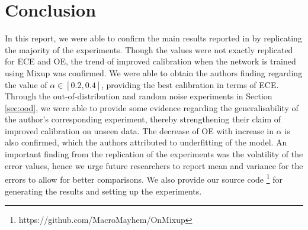 \documentclass{article}
\begin{document}
\section{Conclusion}
\label{sec:conclusion}
In this report, we were able to confirm the main
results reported in \cite{onmixup} by replicating the majority of the experiments. Though the values were not exactly replicated for ECE and OE, the trend of improved calibration when the network is trained using Mixup was confirmed. We were able to obtain the authors finding regarding the value of $\alpha \in [0.2, 0.4]$, providing the best calibration in terms of ECE. Through the out-of-distribution and random noise experiments in Section \ref{sec:ood}, we were able to provide some evidence regarding the generalisability of the author's corresponding experiment, thereby strengthening their claim of improved calibration on unseen data. The decrease of OE with increase in $\alpha$ is also confirmed, which the authors attributed to underfitting of the model. An important finding from the replication of the experiments was the volatility of the error values, hence we urge future researchers to report mean and variance for the errors to allow for better comparisons. We also provide our source code \footnote{https://github.com/MacroMayhem/OnMixup} for generating the results and setting up the experiments.


\end{document}
